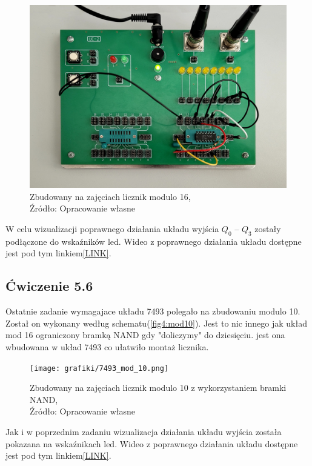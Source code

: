 \documentclass{article}
\begin{document}
      \begin{figure}[!ht]
        \centering
        \includegraphics[scale=0.1]{grafiki/7493_mod_16.png}
        \caption{Zbudowany na zajęciach licznik modulo 16,
        \\Źródło: Opracowanie własne}
      \end{figure}

      W celu wizualizacji poprawnego działania układu wyjścia $Q_0$ -- $Q_3$ zostały podłączone do wskaźników led. Wideo z poprawnego działania układu dostępne jest pod tym linkiem\href{https://youtu.be/uBRxpVXEhjw}{[LINK]}.

    \subsection{Ćwiczenie 5.6}
    
      Ostatnie zadanie wymagajace układu 7493 polegało na zbudowaniu modulo 10. Został on wykonany według schematu(\ref{fig4:mod10}). Jest to nic innego jak układ mod 16 ograniczony bramką NAND gdy "doliczymy"\mbox{} do dziesięciu. jest ona wbudowana w układ 7493 co ułatwiło montaż licznika.

      \begin{figure}[!ht]
        \centering
        \texttt{[image: grafiki/7493\_mod\_10.png]}
        \caption{Zbudowany na zajęciach licznik modulo 10 z wykorzystaniem bramki NAND,
        \\Źródło: Opracowanie własne}
      \end{figure}
      \pagebreak

      Jak i w poprzednim zadaniu wizualizacja działania układu wyjścia została pokazana na wskaźnikach led. Wideo z poprawnego działania układu dostępne jest pod tym linkiem\href{https://www.youtube.com/watch?v=QPkW2fbpPyo}{[LINK]}.
\end{document}
